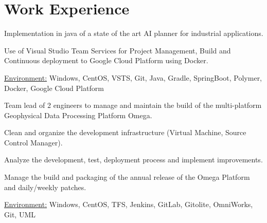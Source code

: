 \documentclass[10pt,letterpaper]{resume/resume}
\begin{document}
  \begin{minipage}[t]{\linewidth}
    \section{Work Experience}


\par Implementation in java of a state of the art AI planner for industrial applications.
\par Use of Visual Studio Team Services for Project Management, Build and Continuous deployment to Google Cloud Platform using Docker.
\par\underline{Environment:} Windows, CentOS, VSTS, Git, Java, Gradle, SpringBoot, Polymer, Docker, Google Cloud Platform

\par Team lead of 2 engineers to manage and maintain the build of the multi-platform Geophysical Data Processing Platform Omega. 
\par Clean and organize the development infrastructure (Virtual Machine, Source Control Manager). 
\par Analyze the development, test, deployment process and implement improvements.
\par Manage the build and packaging of the annual release of the Omega Platform and daily/weekly patches.
\par\underline{Environment:} Windows, CentOS, TFS, Jenkins, GitLab, Gitolite, OmniWorks, Git, UML
%
%


\end{minipage}
\end{document}
